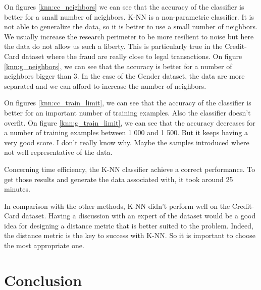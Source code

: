 \documentclass[10pt]{article}
\begin{document}
		On figures \ref{knn:cc_neighbors} we can see that the accuracy of the classifier is better for a small number of neighbors. K-NN is a non-parametric classifier. It is not able to generalize the data, so it is better to use a small number of neighbors. We usually increase the research perimeter to be more resilient to noise but here the data do not allow us such a liberty. This is particularly true in the Credit-Card dataset where the fraud are really close to legal transactions. On figure \ref{knn:g_neighbors}, we can see that the accuracy is better for a number of neighbors bigger than 3. In the case of the Gender dataset, the data are more separated and we can afford to increase the number of neighbors.

		On figures \ref{knn:cc_train_limit}, we can see that the accuracy of the classifier is better for an important number of training examples. Also the classifier doesn't overfit. On figure \ref{knn:g_train_limit}, we can see that the accuracy decreases for a number of training examples between 1 000 and 1 500. But it keeps having a very good score. I don't really know why. Maybe the samples introduced where not well representative of the data.

		Concerning time efficiency, the K-NN classifier achieve a correct performance. To get those results and generate the data associated with, it took around 25 minutes.

		In comparison with the other methods, K-NN didn't  perform well on the Credit-Card dataset. Having a discussion with an expert of the dataset would be a good idea for designing a distance metric that is better suited to the problem. Indeed, the distance metric is the key to success with K-NN. So it is important to choose the most appropriate one.
	\section{Conclusion}
\end{document}
